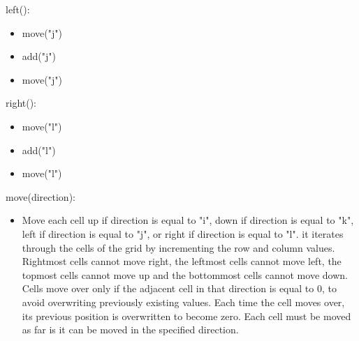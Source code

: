 \documentclass[12pt]{article}
\begin{document}
\noindent left():
\begin{itemize}
\item \mbox{move("j")}
\item \mbox{add("j")}
\item \mbox{move("j")}
\end{itemize}

\noindent right():
\begin{itemize}
\item \mbox{move("l")}
\item \mbox{add("l")}
\item \mbox{move("l")}
\end{itemize}

\noindent move(direction):
\begin{itemize}
\item Move each cell up if direction is equal to "i", down if direction is equal to "k", left if direction is equal to "j", or right if direction is equal to "l". it iterates through the cells of the grid by incrementing the row and column values. Rightmost cells cannot move right, the leftmost cells cannot move left, the topmost cells cannot move up and the bottommost cells cannot move down. Cells move over only if the adjacent cell in that direction is equal to 0, to avoid overwriting previously existing values. Each time the cell moves over, its previous position is overwritten to become zero. Each cell must be moved as far is it can be moved in the specified direction.
\end{itemize}
\end{document}
